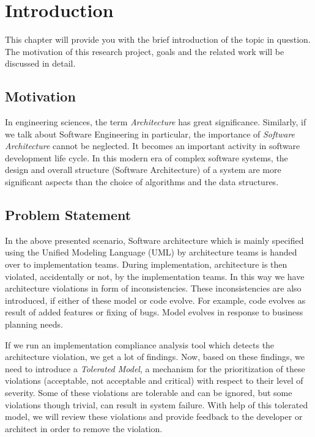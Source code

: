 \chapter{Introduction}
\setcounter{page}{1}%
\thispagestyle{empty}

This chapter will provide you with the brief introduction of the topic in question. The motivation of this research project, goals and the related work will be discussed in detail.

\section{Motivation}\label{motivation}
In engineering sciences, the term \textit{Architecture} has great significance. Similarly, if we talk about Software Engineering in particular, the importance of \textit{Software Architecture} cannot be neglected. It becomes an important activity in software development life cycle. In this modern era of complex software systems, the design and overall structure (Software Architecture) of a system are more significant aspects than the choice of algorithms and the data structures.\newline

\section{Problem Statement}\label{problemStatement}
In the above presented scenario, Software architecture which is mainly specified using the Unified Modeling Language (UML) by architecture teams is handed over to implementation teams. During implementation, architecture is then violated, accidentally or not, by the implementation teams. In this way we have architecture violations in form of inconsistencies. These inconsistencies are also introduced, if either of these model or code evolve. For example, code evolves as result of added features or fixing of bugs. Model evolves in response to business planning needs. \newline

If we run an implementation compliance analysis tool which detects the architecture violation, we get a lot of findings. Now, based on these findings, we need to introduce a \textit{Tolerated Model}, a mechanism for the prioritization of these violations (acceptable, not acceptable and critical) with respect to their level of severity. Some of these violations are tolerable and can be ignored, but some violations though trivial, can  result in system failure. With help of this tolerated model, we will review these violations and provide feedback to the developer or architect in order to remove the violation.  

